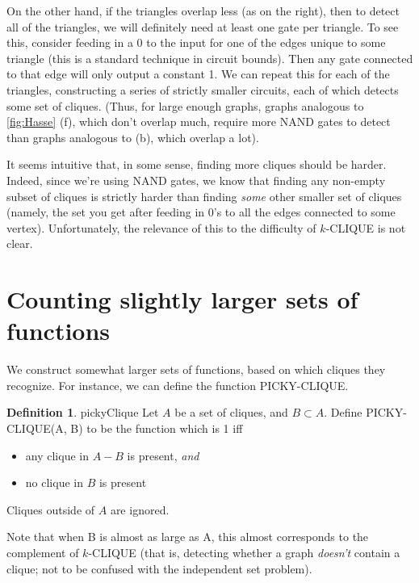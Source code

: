 \documentclass[12pt]{article}
\theoremstyle{definition}
\newtheorem{defn}{Definition}[section]
\begin{document}
On the other hand, if the triangles overlap less (as on the right),
then to detect all of the triangles, we will definitely need at least one
gate per triangle.
To see this, consider feeding in a 0 to the input for one
of the edges unique to some triangle (this is a
standard technique in circuit bounds).
Then any gate connected to
that edge will only output a constant 1. We can repeat this for each of the
triangles, constructing a series of strictly smaller circuits, each of which 
detects some set of cliques. (Thus, for large enough graphs,
graphs analogous to \ref{fig:Hasse} (f), which don't overlap much,
require more NAND gates to detect than graphs 
analogous to (b), which overlap
a lot).

It seems intuitive that, in some sense, finding more cliques should
be harder.
Indeed, since we're using NAND gates, we know that finding any non-empty
subset of cliques is strictly harder than finding {\em some} other 
smaller set of cliques (namely, the set you get after feeding in 0's to
all the edges connected to some vertex).
Unfortunately, the relevance of this to the difficulty
of $k$-CLIQUE is not clear.

\section{Counting slightly larger sets of functions}

We construct somewhat larger sets of functions, based on
which cliques they recognize. For instance, we can define the
function PICKY-CLIQUE.

\begin{defn}{pickyClique}
Let $A$ be a set of cliques, and $B \subset A$.
Define PICKY-CLIQUE(A, B) to be the function which is 1 iff

\begin{itemize}

\item any clique in $A-B$ is present, {\em and}

\item no clique in $B$ is present

\end{itemize}
Cliques outside of $A$ are ignored.

\end{defn}

Note that when B is almost as large as A,
this almost corresponds to the complement of
$k$-CLIQUE (that is, detecting whether a graph
{\em doesn't} contain a clique; not to be
confused with the independent set problem).
\end{document}
